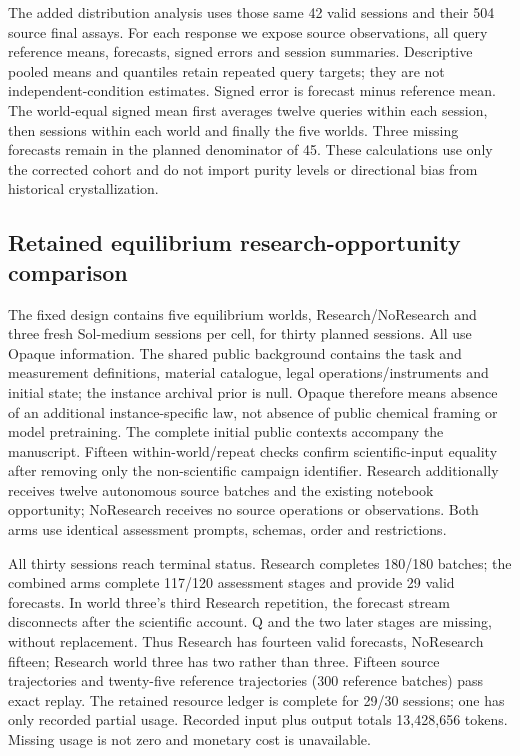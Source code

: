 \documentclass[10pt,a4paper]{article}
\begin{document}
The added distribution analysis uses those same 42 valid sessions and their 504 source final assays. For each response we expose source observations, all query reference means, forecasts, signed errors and session summaries. Descriptive pooled means and quantiles retain repeated query targets; they are not independent-condition estimates. Signed error is forecast minus reference mean. The world-equal signed mean first averages twelve queries within each session, then sessions within each world and finally the five worlds. Three missing forecasts remain in the planned denominator of 45. These calculations use only the corrected cohort and do not import purity levels or directional bias from historical crystallization.

\subsection{Retained equilibrium research-opportunity comparison}\label{retained-equilibrium-research-opportunity-comparison}

The fixed design contains five equilibrium worlds, Research/NoResearch and three fresh Sol-medium sessions per cell, for thirty planned sessions. All use Opaque information. The shared public background contains the task and measurement definitions, material catalogue, legal operations/instruments and initial state; the instance archival prior is null. Opaque therefore means absence of an additional instance-specific law, not absence of public chemical framing or model pretraining. The complete initial public contexts accompany the manuscript. Fifteen within-world/repeat checks confirm scientific-input equality after removing only the non-scientific campaign identifier. Research additionally receives twelve autonomous source batches and the existing notebook opportunity; NoResearch receives no source operations or observations. Both arms use identical assessment prompts, schemas, order and restrictions.

All thirty sessions reach terminal status. Research completes 180/180 batches; the combined arms complete 117/120 assessment stages and provide 29 valid forecasts. In world three's third Research repetition, the forecast stream disconnects after the scientific account. Q and the two later stages are missing, without replacement. Thus Research has fourteen valid forecasts, NoResearch fifteen; Research world three has two rather than three. Fifteen source trajectories and twenty-five reference trajectories (300 reference batches) pass exact replay. The retained resource ledger is complete for 29/30 sessions; one has only recorded partial usage. Recorded input plus output totals 13,428,656 tokens. Missing usage is not zero and monetary cost is unavailable.
\end{document}
